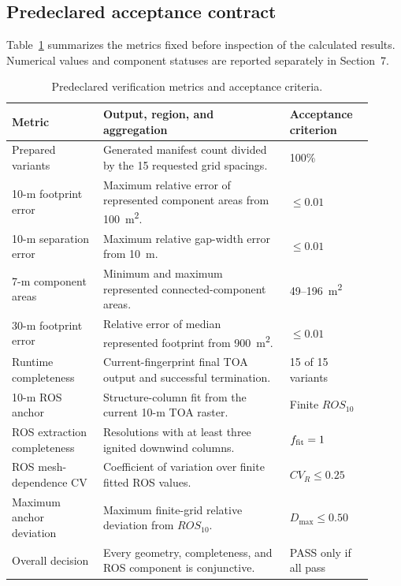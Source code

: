 \subsection{Predeclared acceptance contract}

Table~\ref{tab:acceptance-contract} summarizes the metrics fixed before
inspection of the calculated results. Numerical values and component statuses
are reported separately in Section~7.

\begin{table}[H]
\centering
\footnotesize
\caption{Predeclared verification metrics and acceptance criteria.}
\label{tab:acceptance-contract}
\begin{tabular}{@{}p{0.23\linewidth}p{0.47\linewidth}p{0.21\linewidth}@{}}
\toprule
Metric & Output, region, and aggregation & Acceptance criterion\\
\midrule
Prepared variants & Generated manifest count divided by the 15 requested grid spacings. & 100\% \\
10-m footprint error & Maximum relative error of represented component areas from \SI{100}{m^2}. & \(\le0.01\) \\
10-m separation error & Maximum relative gap-width error from \SI{10}{m}. & \(\le0.01\) \\
7-m component areas & Minimum and maximum represented connected-component areas. & 49--\SI{196}{m^2} \\
30-m footprint error & Relative error of median represented footprint from \SI{900}{m^2}. & \(\le0.01\) \\
Runtime completeness & Current-fingerprint final TOA output and successful termination. & 15 of 15 variants \\
10-m ROS anchor & Structure-column fit from the current 10-m TOA raster. & Finite \(ROS_{10}\) \\
ROS extraction completeness & Resolutions with at least three ignited downwind columns. & \(f_{\rm fit}=1\) \\
ROS mesh-dependence CV & Coefficient of variation over finite fitted ROS values. & \(CV_R\le0.25\) \\
Maximum anchor deviation & Maximum finite-grid relative deviation from \(ROS_{10}\). & \(D_{\max}\le0.50\) \\
Overall decision & Every geometry, completeness, and ROS component is conjunctive. & PASS only if all pass \\
\bottomrule
\end{tabular}
\end{table}

